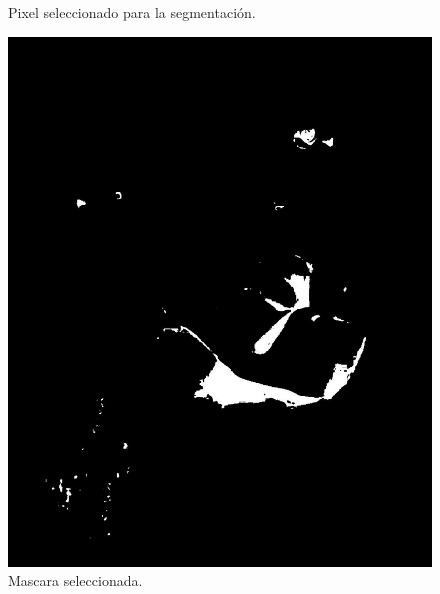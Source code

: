 \documentclass[11pt, letterpaper]{article}
\begin{document}
\begin{figure}[h!]
\begin{minipage}{0.4\textwidth}
		\caption*{Pixel seleccionado para la segmentación.}
	\end{minipage}
	
	\vspace{1em} %
	
	\begin{minipage}{0.4\textwidth}
		\centering
		\includegraphics[width=\textwidth]{IMG/R32.jpg}
		\caption*{Mascara seleccionada.}
	\end{minipage}\hfill
	\begin{minipage}{0.4\textwidth}
		\centering

\end{minipage}
\end{figure}
\end{document}
